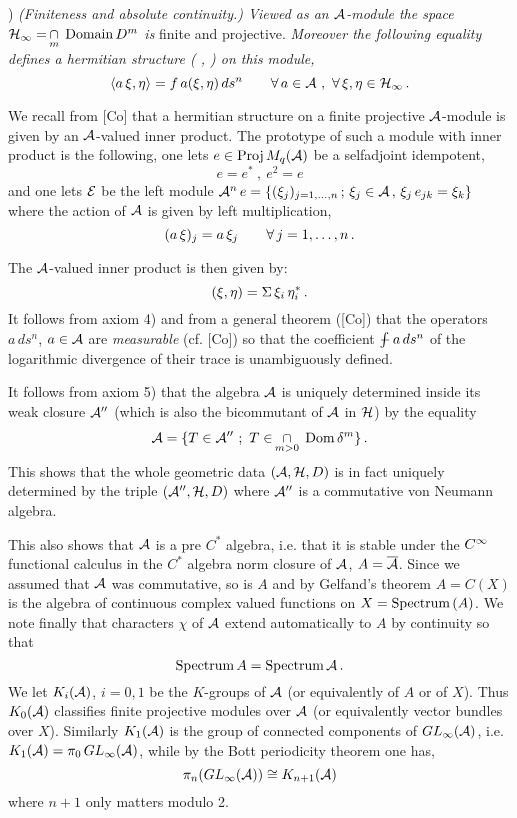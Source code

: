 ) {\it (Finiteness and absolute continuity.)
Viewed as an ${\cal A}$-module the space $\Hc_{\ify} = \,
\build \cap_{m}^{} \, \hbox{\rm Domain} \, D^m$ is}
finite and projective. {\it Moreover the following
equality defines a hermitian structure ( , ) on this
module,} 
$$
\langle a \, \xi ,\eta \rangle = f \, a (\xi ,\eta) \, ds^n
\qquad \forall \, a \in {\cal A} \ , \ \forall \, \xi ,\eta \in
{\cal H}_{\infty} \, .
$$

\medskip

\noindent We recall from [Co] that a hermitian structure on
a finite projective ${\cal A}$-module is given by an
${\cal A}$-valued inner product. The prototype of such a
module with inner product is the following, one lets
$e\in \mathop{\rm Proj}\nolimits M_q ({\cal A})$ be a selfadjoint idempotent,
$$
e=e^* \ , \ e^2 =e
$$
and one lets ${\cal E}$ be the left module ${\cal A}^n \, e = \{
(\xi_j)_{j=1,\ldots ,n} \, ; \, \xi_j \in {\cal A} \, , \,
\xi_j \, e_{jk} = \xi_k \}$ where the action of ${\cal A}$ is
given by left multiplication,
$$
(a \, \xi)_j = a \, \xi_j \qquad \forall \, j=1,\ldots ,n \,
.
$$

\noindent The ${\cal A}$-valued inner product is then given by:
$$
(\xi ,\eta) = \Sigma \, \xi_i \, \eta_i^* \, .
$$
It follows from axiom 4) and from a general theorem ([Co])
that the operators $a \, ds^n$, $a \in {\cal A}$ are {\it
measurable} (cf. [Co]) so that the coefficient $\int \!\!\!\!\! -
\, a \, ds^n$ of the logarithmic divergence of their trace
is unambiguously defined.

 It follows from axiom 5) that the algebra ${\cal A}$
is uniquely determined inside its weak closure ${\cal A}''$
(which is also the bicommutant of ${\cal A}$ in ${\cal H}$) by the
equality
$$
\Ac = \{ T\in \Ac'' \ ; \ T\in \, \build \cap_{m>0}^{} \,
\Dom \d^m \} \, .
$$
This shows that the whole geometric data $({\cal A} ,{\cal H} ,D)$
is in fact uniquely determined by the triple $({\cal A}'' ,{\cal H}
,D)$ where ${\cal A}''$ is a commutative von Neumann algebra.

 This also shows that ${\cal A}$ is a pre $C^*$
algebra, i.e. that it is stable under the $C^{\infty}$
functional calculus in the $C^*$ algebra norm closure of
${\cal A}$, $A=\overline{{\cal A}}$. Since we assumed that ${\cal A}$ was
commutative, so is $A$ and by Gelfand's theorem $A =
C(X)$ is the algebra of continuous complex valued
functions on $X = \hbox{Spectrum} \, (A)$. We note
finally that characters $\chi$ of ${\cal A}$ extend
automatically to $A$ by continuity so that
$$
\hbox{Spectrum} \, A = \hbox{Spectrum} \, {\cal A} \, .
$$
We let $K_i ({\cal A})$, $i=0,1$ be the $K$-groups of ${\cal A}$
(or equivalently of $A$ or of $X$). Thus $K_0 ({\cal A})$
classifies finite projective modules over ${\cal A}$ (or
equivalently vector bundles over $X$). Similarly $K_1
({\cal A})$ is the group of connected components of $GL_{\infty}
({\cal A})$, i.e. $K_1 ({\cal A}) = \pi_0 \, GL_{\infty} ({\cal A})$,
while by the Bott periodicity theorem one has,
$$
\pi_n (GL_{\infty} ({\cal A})) \cong K_{n+1} ({\cal A})
$$
where $n+1$ only matters modulo 2.

